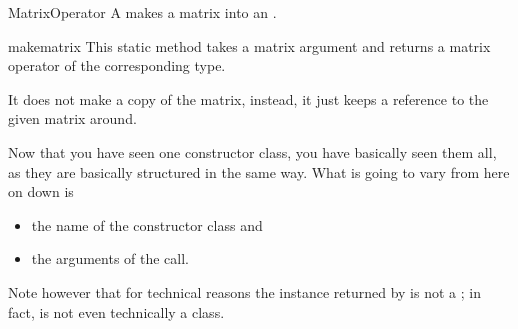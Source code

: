 \begin{classdesc*}{MatrixOperator}
  A  makes a matrix into an .
\end{classdesc*}
\begin{methoddesc}{make}{matrix}
  This static method takes a matrix argument and returns a matrix
  operator of the corresponding type.

  It does not make a copy of the matrix, instead, it just keeps
  a reference to the given matrix around.
\end{methoddesc}

Now that you have seen one constructor class, you have basically
seen them all, as they are basically structured in the same way.
What is going to vary from here on down is
\begin{itemize}
\item the name of the constructor class and
\item the arguments of the  call.
\end{itemize}
Note however that for technical reasons the instance returned by
 is not a ; in fact, 
is not even technically a class.

